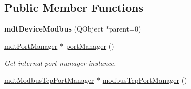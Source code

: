 \subsection*{Public Member Functions}
\begin{DoxyCompactItemize}
\item 
\hypertarget{classmdt_device_modbus_ac69cfbe26681342ba05672ab63de2a1f}{
{\bfseries mdtDeviceModbus} (QObject $\ast$parent=0)}
\label{classmdt_device_modbus_ac69cfbe26681342ba05672ab63de2a1f}

\item 
\hypertarget{classmdt_device_modbus_aed892b501f8cbd372ccfda1a4fafa536}{
\hyperlink{classmdt_port_manager}{mdtPortManager} $\ast$ \hyperlink{classmdt_device_modbus_aed892b501f8cbd372ccfda1a4fafa536}{portManager} ()}
\label{classmdt_device_modbus_aed892b501f8cbd372ccfda1a4fafa536}

\begin{DoxyCompactList}\small\item\em Get internal port manager instance. \end{DoxyCompactList}\item 
\hypertarget{classmdt_device_modbus_ac547788aa95d46c00ddb1342eb46ef93}{
\hyperlink{classmdt_modbus_tcp_port_manager}{mdtModbusTcpPortManager} $\ast$ \hyperlink{classmdt_device_modbus_ac547788aa95d46c00ddb1342eb46ef93}{modbusTcpPortManager} ()}
\label{classmdt_device_modbus_ac547788aa95d46c00ddb1342eb46ef93}


\end{DoxyCompactItemize}
